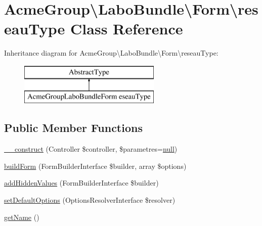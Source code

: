 \hypertarget{class_acme_group_1_1_labo_bundle_1_1_form_1_1reseau_type}{\section{Acme\+Group\textbackslash{}Labo\+Bundle\textbackslash{}Form\textbackslash{}reseau\+Type Class Reference}
\label{class_acme_group_1_1_labo_bundle_1_1_form_1_1reseau_type}
}
Inheritance diagram for Acme\+Group\textbackslash{}Labo\+Bundle\textbackslash{}Form\textbackslash{}reseau\+Type\+:\begin{figure}[H]
\begin{center}
\leavevmode
\includegraphics[height=2.000000cm]{class_acme_group_1_1_labo_bundle_1_1_form_1_1reseau_type}
\end{center}
\end{figure}
\subsection*{Public Member Functions}
\begin{DoxyCompactItemize}
\item 
\hyperlink{class_acme_group_1_1_labo_bundle_1_1_form_1_1reseau_type_a8bce0778598a4339a712e3fe5f01b563}{\+\_\+\+\_\+construct} (Controller \$controller, \$parametres=\hyperlink{validate_8js_afb8e110345c45e74478894341ab6b28e}{null})
\item 
\hyperlink{class_acme_group_1_1_labo_bundle_1_1_form_1_1reseau_type_ad2fd1ce094cbbe3bd634cfe5a0982b71}{build\+Form} (Form\+Builder\+Interface \$builder, array \$options)
\item 
\hyperlink{class_acme_group_1_1_labo_bundle_1_1_form_1_1reseau_type_a39c01847a31343cc9c62fa5c1c6b6c5b}{add\+Hidden\+Values} (Form\+Builder\+Interface \$builder)
\item 
\hyperlink{class_acme_group_1_1_labo_bundle_1_1_form_1_1reseau_type_a801d6d4b0b93f1999feed4fb47c2c3aa}{set\+Default\+Options} (Options\+Resolver\+Interface \$resolver)
\item 
\hyperlink{class_acme_group_1_1_labo_bundle_1_1_form_1_1reseau_type_a5ad9c82418ced29177700f9b91c1d5e3}{get\+Name} ()
\end{DoxyCompactItemize}



